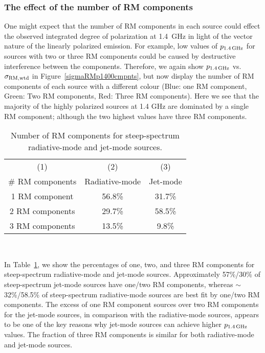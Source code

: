 \documentclass{mnras}
\newcommand*\sigmaRMwtd{\sigma_{\rm RM, wtd}}
\begin{document}
\subsubsection{The effect of the number of RM components}
\label{RMcmpnts}
One might expect that the number of RM components in each source could effect the observed integrated degree of polarization at 1.4~GHz in light of the vector nature of the linearly polarized emission. For example, low values of $p_{1.4\, {\rm GHz}}$ for sources with two or three RM components could be caused by destructive interference between the components. 
Therefore, we again show $p_{1.4\, {\rm GHz}}$ vs.~$\sigmaRMwtd$ in Figure~\ref{sigmaRMp1400cmpnts}, but now display the number of RM components of each source with a different colour (Blue: one RM component, Green: Two RM components, Red: Three RM components). Here we see that the majority of the highly polarized sources at 1.4 GHz are dominated by a single RM component; although the two highest values have three RM components. 

\begin{table}%
 \caption{Number of RM components for steep-spectrum radiative-mode and jet-mode sources.}
 \centering
   \begin{tabular}{ccc}
    \hline\hline
       (1) & (2) & (3)   \\
     \# RM components   & Radiative-mode       & Jet-mode         \\
      \hline            
1 RM component         & 56.8\%        & 31.7\%    \\ 
2 RM components        & 29.7\%        & 58.5\%  \\
3 RM components       & 13.5\%         & 9.8\%  \\
\hline
   \end{tabular}\\
\label{radjetRMcmpnts}
\end{table}

In Table~\ref{radjetRMcmpnts}, we show the percentages of one, two, and three RM components for steep-spectrum radiative-mode and jet-mode sources. 
Approximately 57\%/30\% of steep-spectrum jet-mode sources have one/two RM components, whereas $\sim$32\%/58.5\% of steep-spectrum radiative-mode sources are best fit by one/two RM components. The excess of one RM component sources over two RM components for the jet-mode sources, in comparison with the radiative-mode sources, appears to be one of the key reasons why jet-mode sources can achieve higher $p_{1.4\, {\rm GHz}}$ values. 
The fraction of three RM components is similar for both radiative-mode and jet-mode sources. 
\end{document}
